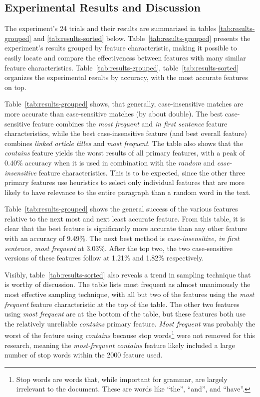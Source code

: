 \subsection{Experimental Results and Discussion}

The experiment's 24 trials and their results are summarized in tables \ref{tab:results-grouped} and \ref{tab:results-sorted} below.
Table~\ref{tab:results-grouped} presents the experiment's results grouped by feature characteristic, making it possible to easily locate and compare the effectiveness between features with many similar feature characteristics.
Table~\ref{tab:results-grouped}, table~\ref{tab:results-sorted} organizes the experimental results by accuracy, with the most accurate features on top.

Table~\ref{tab:results-grouped} shows, that generally, case-insensitive matches are more accurate than case-sensitive matches (by about double).
The best case-sensitive feature combines the {\it most frequent} and {\it in first sentence} feature characteristics, while the best case-insensitive feature (and best overall feature) combines {\it linked article titles} and {\it most frequent}.
The table also shows that the {\it contains} feature yields the worst results of all primary features, with a peak of 0.40\% accuracy when it is used in combination with the {\it random} and {\it case-insensitive} feature characteristics.
This is to be expected, since the other three primary features use heuristics to select only individual features that are more likely to have relevance to the entire paragraph than a random word in the text.

Table~\ref{tab:results-grouped} shows the general success of the various features relative to the next most and next least accurate feature.
From this table, it is clear that the best feature is significantly more accurate than any other feature with an accuracy of 9.49\%.
The next best method is {\it case-insensitive, in first sentence, most frequent} at 3.03\%.
After the top two, the two case-sensitive versions of these features follow at 1.21\% and 1.82\% respectively.

Visibly, table~\ref{tab:results-sorted} also reveals a trend in sampling technique that is worthy of discussion.
The table lists most frequent as almost unanimously the most effective sampling technique, with all but two of the features using the {\it most frequent} feature characteristic at the top of the table.
The other two features using {\it most frequent} are at the bottom of the table, but these features both use the relatively unreliable {\it contains} primary feature.
{\it Most frequent} was probably the worst of the feature using {\it contains} because stop words\footnote{Stop words are words that, while important for grammar, are largely irrelevant to the document. These are words like ``the'', ``and'', and ``have''.} were not removed for this research, meaning the {\it most-frequent contains} feature likely included a large number of stop words within the 2000 feature used.

